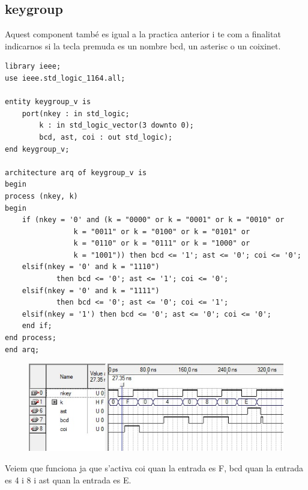 \documentclass[12pt, a4papre]{article}
\begin{document}
\subsection{keygroup}

	Aquest component també es igual a la practica anterior i te com a finalitat indicarnos si la tecla premuda es un nombre bcd, un asterisc o un coixinet.
	
		\begin{lstlisting}[style=vhdl, frame=single, basicstyle=\tiny]
	library ieee;
use ieee.std_logic_1164.all;

entity keygroup_v is
	port(nkey : in std_logic;
		k : in std_logic_vector(3 downto 0);
		bcd, ast, coi : out std_logic);
end keygroup_v;

architecture arq of keygroup_v is
begin
process (nkey, k)
begin
	if (nkey = '0' and (k = "0000" or k = "0001" or k = "0010" or
				k = "0011" or k = "0100" or k = "0101" or
				k = "0110" or k = "0111" or k = "1000" or
				k = "1001")) then bcd <= '1'; ast <= '0'; coi <= '0';
	elsif(nkey = '0' and k = "1110")
			then bcd <= '0'; ast <= '1'; coi <= '0';
	elsif(nkey = '0' and k = "1111")
			then bcd <= '0'; ast <= '0'; coi <= '1';
	elsif(nkey = '1') then bcd <= '0'; ast <= '0'; coi <= '0';
	end if;
end process;
end arq;
		\end{lstlisting}
		
			\begin{figure}[H]
		\begin{center}
		\includegraphics[width=130mm]{simulaciokeygroup.jpeg}
		\end{center}
	\end{figure}	
	Veiem que funciona ja que s'activa coi quan la entrada es F, bcd quan la entrada es 4 i 8 i ast quan la entrada es E.
	
\end{document}
